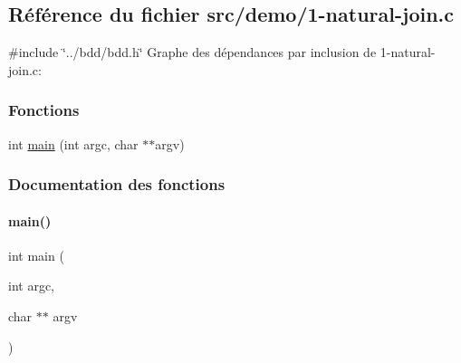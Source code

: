 \hypertarget{1-natural-join_8c}{}\subsection{Référence du fichier src/demo/1-\/natural-\/join.c}
\label{1-natural-join_8c}
{\ttfamily \#include \char`\"{}../bdd/bdd.\+h\char`\"{}}\newline
Graphe des dépendances par inclusion de 1-\/natural-\/join.c\+:
\subsubsection*{Fonctions}
\begin{DoxyCompactItemize}
\item 
int \hyperlink{1-natural-join_8c_a3c04138a5bfe5d72780bb7e82a18e627}{main} (int argc, char $\ast$$\ast$argv)
\end{DoxyCompactItemize}


\subsubsection{Documentation des fonctions}
\mbox{\label{1-natural-join_8c_a3c04138a5bfe5d72780bb7e82a18e627}} 
\paragraph{\texorpdfstring{main()}{main()}}
{\footnotesize\ttfamily int main (\begin{DoxyParamCaption}\item[{int}]{argc,  }\item[{char $\ast$$\ast$}]{argv }\end{DoxyParamCaption})}

